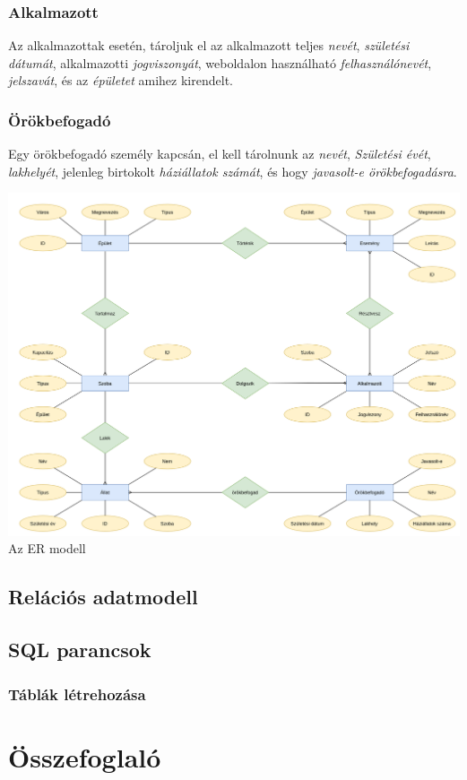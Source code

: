 \documentclass[a4paper,12pt]{article}
\begin{document}
\subsubsection*{Alkalmazott}
Az alkalmazottak esetén, tároljuk el az alkalmazott teljes \textit{nevét}, \textit{születési dátumát}, alkalmazotti \textit{jogviszonyát}, weboldalon használható \textit{felhasználónevét}, \textit{jelszavát}, és az \textit{épületet} amihez kirendelt.
\subsubsection*{Örökbefogadó}
Egy örökbefogadó személy kapcsán, el kell tárolnunk az \textit{nevét}, \textit{Születési évét}, \textit{lakhelyét}, jelenleg birtokolt \textit{háziállatok számát},  és hogy \textit{javasolt-e örökbefogadásra}.



\begin{center}
	\includegraphics[width = 17cm]{"SQL_tervezés.png"} \\
	{\small Az ER modell}
\end{center}


\subsection{Relációs adatmodell}
\subsection{SQL parancsok}
\subsubsection{Táblák létrehozása}
\section{Összefoglaló}
\end{document}
